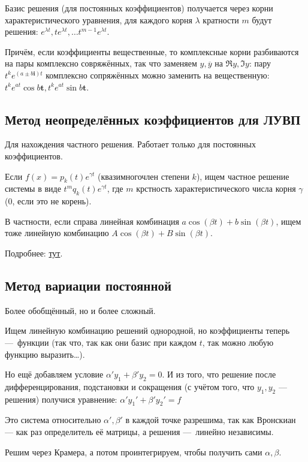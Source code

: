 \documentclass[12pt, a4paper]{article}
\begin{document}
Базис решения (для постоянных коэффициентов) получается через корни характеристического уравнения, 
для каждого корня $\lambda$ кратности $m$ будут решения: $e^{\lambda t}, te^{\lambda t}, … t^{m - 1} e^{\lambda t}$.

Причём, если коэффициенты вещественные, то комплексные корни разбиваются на пары комплексно совряжённых, 
так что заменяем $y, \overline{y}$ на $\Re y, \Im y$: пару $t^k e^{(a ± b\mathbf{i})t}$ комплексно сопряжённых можно заменить на вещественную:
$t^k e^{at} \cos b\mathbf{t}, t^k e^{at} \sin b\mathbf{t}$.


\subsection{Метод неопределённых коэффициентов для ЛУВП}

Для нахождения частного решения. Работает только для постоянных коэффициентов.

Если $f(x) = p_k(t) e^{\gamma t}$ (квазимногочлен степени $k$),
ищем частное решение системы в виде $t^m q_k(t) e^{\gamma t}$, где $m$ крстность характеристического числа корня $\gamma$ ($0$, если это не корень).

В частности, если справа линейная комбинация $a \cos(βt)+b \sin(βt)$, ищем тоже линейную комбинацию $A \cos(βt)+ B \sin(βt)$.

Подробнее: \href{https://tutorial.math.lamar.edu/Classes/DE/UndeterminedCoefficients.aspx}{тут}.

\subsection{Метод вариации постоянной}

Более обобщённый, но и более сложный.

Ищем линейную комбинацию решений однородной, но коэффициенты теперь — функции (так что, так как они базис при каждом $t$, так можно любую функцию выразить…).

Но ещё добавляем условие $\alpha' y_1 + \beta' y_2 = 0$.
И из того, что решение после дифференцирования, подстановки и сокращения (с учётом того, что $y_1, y_2$ — решения) 
получися уравнение: $\alpha' y_1' + \beta' y_2' = f$

Это система относительно $\alpha', \beta'$ в каждой точке разрешима, так как Вронскиан — как раз определитель её матрицы, а решения — линейно независимы.

Решим через Крамера, а потом проинтегрируем, чтобы получить сами $\alpha, \beta$.
\end{document}
